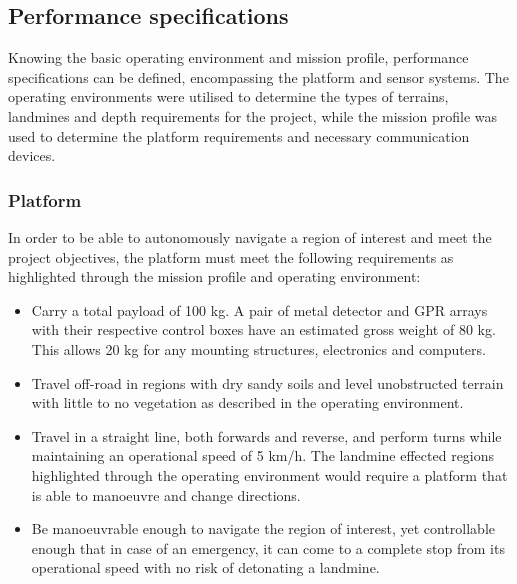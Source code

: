 \documentclass[main.tex]{subfiles}
\begin{document}
\subsection{Performance specifications}
Knowing the basic operating environment and mission profile, performance specifications can be defined, encompassing the platform and sensor systems. The operating environments were utilised to determine the types of terrains, landmines and depth requirements for the project, while the mission profile was used to determine the platform requirements and necessary communication devices.   

\subsubsection{Platform}
In order to be able to autonomously navigate a region of interest and meet the project objectives, the platform must meet the following requirements as highlighted through the mission profile and operating environment: 
\begin{itemize}
 \item Carry a total payload of 100 kg. A pair of metal detector and GPR arrays with their respective control boxes have an estimated gross weight of 80 kg. This allows 20 kg for any mounting structures,  electronics and computers.
 \item Travel off-road in regions with dry sandy soils and level unobstructed terrain with little to no vegetation as described in the operating environment.
\item Travel in a straight line, both forwards and reverse, and perform turns while maintaining an operational speed of 5 km/h. The landmine effected regions highlighted through the operating environment would require a platform that is able to manoeuvre and change directions.  
\item Be manoeuvrable enough to navigate the region of interest, yet controllable enough that in case of an emergency, it can come to a complete stop from its operational speed with no risk of detonating a landmine.
\end{itemize}
\end{document}
